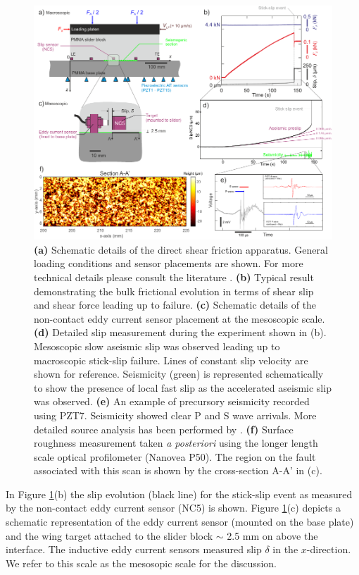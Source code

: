 \documentclass[preprint,1p, 10pt,authoryear]{elsarticle}
\begin{document}
\begin{figure}
 	\centering
 	\includegraphics{FIG1_revised.pdf} 
 	\caption{ \textbf{(a)} Schematic details of the direct shear friction apparatus. General loading conditions and sensor placements are shown. For more technical details please consult the literature \citep{Selvadurai2015, Selvadurai2015a}. \textbf{(b)} Typical result demonstrating the bulk frictional evolution in terms of shear slip and shear force leading up to failure. \textbf{(c)} Schematic details of the non-contact eddy current sensor placement at the mesoscopic scale. \textbf{(d)} Detailed slip measurement during the experiment shown in (b).  Mesoscopic slow aseismic slip was observed leading up to macroscopic stick-slip failure.  Lines of constant slip velocity are shown for reference.  Seismicity (green) is represented schematically to show the presence of local fast slip as the accelerated aseismic slip was observed. \textbf{(e)}  An example of precursory seismicity recorded using PZT7.  Seismicity showed clear P and S wave arrivals. More detailed source analysis has been performed by \citet{Selvadurai2019}. \textbf{(f)} Surface roughness measurement taken \textit{a posteriori} using the longer length scale optical profilometer (Nanovea P50).  The region on the fault associated with this scan is shown by the cross-section A-A’ in (c).}
 	\label{fig1}
 \end{figure}
In Figure \ref{fig1}(b) the slip evolution (black line) for the stick-slip event as measured by the non-contact eddy current sensor (NC5) is shown.  Figure \ref{fig1}(c) depicts a schematic representation of the eddy current sensor (mounted on the base plate) and the wing target attached to the slider block $\sim$ 2.5 mm on above the interface.  The inductive eddy current sensors measured slip $\delta$ in the $x$-direction. We refer to this scale as the mesosopic scale for the discussion.
 
\end{document}
